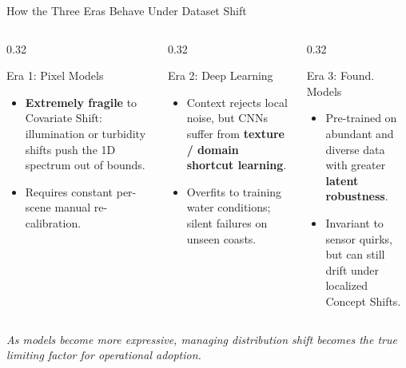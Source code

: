 \documentclass[aspectratio=169,10pt]{beamer}
\begin{document}
\begin{frame}{How the Three Eras Behave Under Dataset Shift}
  \begin{columns}[T,onlytextwidth]
    \begin{column}{0.32\textwidth}
      \begin{block}{Era 1: Pixel Models}
        \scriptsize
        \begin{itemize}
          \item \textbf{Extremely fragile} to Covariate Shift: illumination or turbidity shifts push the 1D spectrum out of bounds.
          \item Requires constant per-scene manual re-calibration.
        \end{itemize}
      \end{block}
    \end{column}
    \begin{column}{0.32\textwidth}
      \begin{alertblock}{Era 2: Deep Learning}
        \scriptsize
        \begin{itemize}
          \item Context rejects local noise, but CNNs suffer from \textbf{texture / domain shortcut learning}.
          \item Overfits to training water conditions; silent failures on unseen coasts.
        \end{itemize}
      \end{alertblock}
    \end{column}
    \begin{column}{0.32\textwidth}
      \begin{exampleblock}{Era 3: Found. Models}
        \scriptsize
        \begin{itemize}
          \item Pre-trained on abundant and diverse data with greater \textbf{latent robustness}.
          \item Invariant to sensor quirks, but can still drift under localized Concept Shifts.
        \end{itemize}
      \end{exampleblock}
    \end{column}
  \end{columns}
  \vspace{0.25cm}
  \begin{center}
    \small \textit{As models become more expressive, managing distribution shift becomes the true limiting factor for operational adoption.}
  \end{center}
\end{frame}
\end{document}
